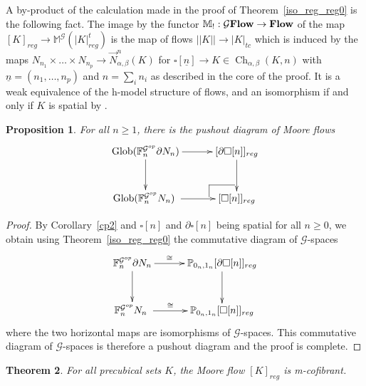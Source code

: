 \documentclass[a4paper,12pt]{amsart}
\makeatletter
\newcommand{\de}{\partial}
\newcommand{\p}{\times}
\renewcommand{\vec}{\overrightarrow}
\renewcommand{\P}{\mathbb{P}}
\newtheorem{thm}{Theorem}[section]
\newtheorem{prop}[thm]{Proposition}
\newcommand{\bp}{\begin{prop}}
\newcommand{\ep}{\end{prop}}
\newcommand{\bth}{\begin{thm}}
\renewcommand{\eth}{\end{thm}}
\newcommand{\bpf}{\begin{proof}}
\newcommand{\epf}{\end{proof}}
\theoremstyle{definition}
\newcommand{\fr}[1]{\ar@{->}[r]^-{#1}}
\newcommand{\fd}[1]{\ar@{->}[d]_-{#1}}
\newcommand{\iso}{\cong}
\renewcommand{\geq}{\geqslant}
\newcommand{\moore}{{\mathbb{M}}}
\newcommand{\lmoore}{\mathbb{M}_!}
\def\cocartesien{%
	\ar@{-}[]+L+<-6pt,+2pt>;[]+LU+<-6pt,+6pt>%
	\ar@{-}[]+U+<-2pt,+6pt>;[]+LU+<-6pt,+6pt>%
}
\newcommand{\brm}[1]{{\rm{\mathbf{#1}}}}
\newcommand{\dtop}{{\brm{Flow}}}
\newcommand{\dtopG}{{\mathcal{G}\brm{Flow}}}
\newcommand{\glob}{{\mathrm{Glob}}}
\DeclareMathOperator{\Ch}{Ch}
\renewcommand{\P}{\mathbb{P}}
\makeatother
\begin{document}
A by-product of the calculation made in the proof of Theorem~\ref{iso_reg_reg0} is the following fact. The image by the functor $\lmoore:\dtopG\to \dtop$ of the map $[K]_{reg} \longrightarrow \moore^{\mathcal{G}}(|K|^t_{reg})$ is the map of flows $||K||\to |K|_{tc}$ which is induced by the maps $N_{n_1} \p \dots \p N_{n_p} \to \vec{N}^{n}_{\alpha,\beta}(K)$ for $\square[\underline{n}] \to K \in \Ch_{\alpha,\beta}(K,n)$ with $\underline{n}=(n_1,\dots,n_p)$ and $n=\sum_i n_i$ as described in the core of the proof. It is a weak equivalence of the h-model structure of flows, and an isomorphism if and only if $K$ is spatial by \cite[Theorem~7.6 and Theorem~7.7]{NaturalRealization}.


\bp \label{pushout}
For all $n\geq 1$, there is the pushout diagram of Moore flows 
\[
\xymatrix@C=3em@R=3em
{
	\glob(\mathbb{F}^{\mathcal{G}^{op}}_n\de N_n) \fd{} \fr{} & [\de\square[n]]_{reg} \fd{} \\
	\glob(\mathbb{F}^{\mathcal{G}^{op}}_n N_n) \fr{} & \cocartesien [\square[n]]_{reg}
}
\]
\ep

\bpf
By Corollary~\ref{cp2} and $\square[n]$ and $\de\square[n]$ being spatial for all $n\geq 0$, we obtain using Theorem~\ref{iso_reg_reg0} the commutative diagram of $\mathcal{G}$-spaces 
\[
\xymatrix@C=3em@R=3em
{
	\mathbb{F}^{\mathcal{G}^{op}}_n\de N_n \fd{} \fr{\iso} & \P_{0_{n},1_{n}}[\de\square[n]]_{reg} \fd{} \\
	\mathbb{F}^{\mathcal{G}^{op}}_n N_n \fr{\iso} &  \P_{0_{n},1_{n}}[\square[n]]_{reg}
}
\]
where the two horizontal maps are isomorphisms of $\mathcal{G}$-spaces. This commutative diagram of $\mathcal{G}$-spaces is therefore a pushout diagram and the proof is complete.
\epf


\bth \label{m-cof-moore-flow}
For all precubical sets $K$, the Moore flow $[K]_{reg}$ is m-cofibrant.
\eth
\end{document}
